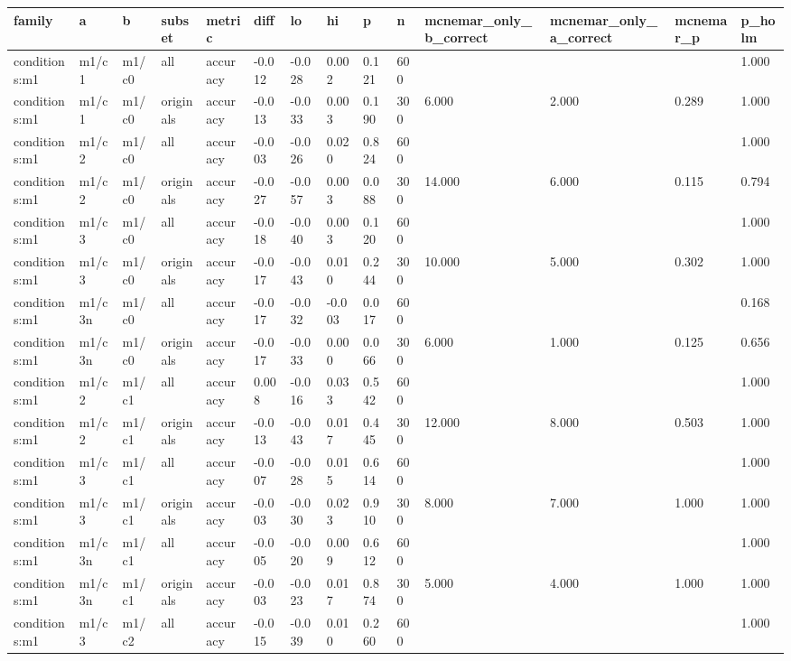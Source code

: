 \begin{tabular}{llllllllllllll}
\toprule
family & a & b & subset & metric & diff & lo & hi & p & n & mcnemar\_only\_b\_correct & mcnemar\_only\_a\_correct & mcnemar\_p & p\_holm \\
\midrule
conditions:m1 & m1/c1 & m1/c0 & all & accuracy & -0.012 & -0.028 & 0.002 & 0.121 & 600 &  &  &  & 1.000 \\
conditions:m1 & m1/c1 & m1/c0 & originals & accuracy & -0.013 & -0.033 & 0.003 & 0.190 & 300 & 6.000 & 2.000 & 0.289 & 1.000 \\
conditions:m1 & m1/c2 & m1/c0 & all & accuracy & -0.003 & -0.026 & 0.020 & 0.824 & 600 &  &  &  & 1.000 \\
conditions:m1 & m1/c2 & m1/c0 & originals & accuracy & -0.027 & -0.057 & 0.003 & 0.088 & 300 & 14.000 & 6.000 & 0.115 & 0.794 \\
conditions:m1 & m1/c3 & m1/c0 & all & accuracy & -0.018 & -0.040 & 0.003 & 0.120 & 600 &  &  &  & 1.000 \\
conditions:m1 & m1/c3 & m1/c0 & originals & accuracy & -0.017 & -0.043 & 0.010 & 0.244 & 300 & 10.000 & 5.000 & 0.302 & 1.000 \\
conditions:m1 & m1/c3n & m1/c0 & all & accuracy & -0.017 & -0.032 & -0.003 & 0.017 & 600 &  &  &  & 0.168 \\
conditions:m1 & m1/c3n & m1/c0 & originals & accuracy & -0.017 & -0.033 & 0.000 & 0.066 & 300 & 6.000 & 1.000 & 0.125 & 0.656 \\
conditions:m1 & m1/c2 & m1/c1 & all & accuracy & 0.008 & -0.016 & 0.033 & 0.542 & 600 &  &  &  & 1.000 \\
conditions:m1 & m1/c2 & m1/c1 & originals & accuracy & -0.013 & -0.043 & 0.017 & 0.445 & 300 & 12.000 & 8.000 & 0.503 & 1.000 \\
conditions:m1 & m1/c3 & m1/c1 & all & accuracy & -0.007 & -0.028 & 0.015 & 0.614 & 600 &  &  &  & 1.000 \\
conditions:m1 & m1/c3 & m1/c1 & originals & accuracy & -0.003 & -0.030 & 0.023 & 0.910 & 300 & 8.000 & 7.000 & 1.000 & 1.000 \\
conditions:m1 & m1/c3n & m1/c1 & all & accuracy & -0.005 & -0.020 & 0.009 & 0.612 & 600 &  &  &  & 1.000 \\
conditions:m1 & m1/c3n & m1/c1 & originals & accuracy & -0.003 & -0.023 & 0.017 & 0.874 & 300 & 5.000 & 4.000 & 1.000 & 1.000 \\
conditions:m1 & m1/c3 & m1/c2 & all & accuracy & -0.015 & -0.039 & 0.010 & 0.260 & 600 &  &  &  & 1.000 \\

\end{tabular}

